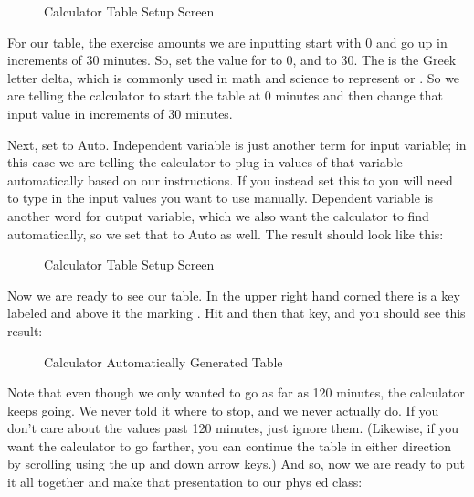\begin{figure}[ht!]
	\centering
	
	\caption{Calculator Table Setup Screen}
\end{figure}

\FloatBarrier

For our table, the exercise amounts we are inputting start with 0 and go up in increments of 30 minutes. So, set the value for  to 0, and  to 30. The \quotes{$\Delta$} is the Greek letter delta, which is commonly used in math and science to represent  or . So we are telling the calculator to start the table at 0 minutes and then change that input value in increments of 30 minutes.

Next, set  to Auto. Independent variable is just another term for input variable; in this case we are telling the calculator to plug in values of that variable automatically based on our instructions. If you instead set this to  you will need to type in the input values you want to use manually. Dependent variable is another word for output variable, which we also want the calculator to find automatically, so we set that to Auto as well. The result should look like this:

\begin{figure}[ht!]
	\centering
	
	\caption{Calculator Table Setup Screen}
\end{figure}

\FloatBarrier

Now we are ready to see our table. In the upper right hand corned there is a key labeled  and above it the marking . Hit  and then that key, and you should see this result:

\begin{figure}[ht!]
	\centering
	
	\caption{Calculator Automatically Generated Table}
\end{figure}

\FloatBarrier

Note that even though we only wanted to go as far as 120 minutes, the calculator keeps going. We never told it where to stop, and we never actually do. If you don’t care about the values past 120 minutes, just ignore them. (Likewise, if you want the calculator to go farther, you can continue the table in either direction by scrolling using the up and down arrow keys.)  And so, now we are ready to put it all together and make that presentation to our phys ed class:

